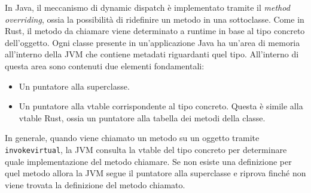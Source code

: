 In Java, il meccanismo di dynamic dispatch è implementato tramite il \textit{method overriding}, ossia la possibilità di ridefinire un metodo in una sottoclasse. Come in Rust, il metodo da chiamare viene determinato a runtime in base al tipo concreto dell'oggetto. Ogni classe presente in un'applicazione Java ha un'area di memoria all'interno della JVM che contiene metadati riguardanti quel tipo. All'interno di questa area sono contenuti due elementi fondamentali:
\begin{itemize}
    \item Un puntatore alla superclasse.
    \item Un puntatore alla vtable corrispondente al tipo concreto. Questa è simile alla vtable Rust, ossia un puntatore alla tabella dei metodi della classe.
\end{itemize}
In generale, quando viene chiamato un metodo su un oggetto tramite \texttt{invokevirtual}, la JVM consulta la vtable del tipo concreto per determinare quale implementazione del metodo chiamare. Se non esiste una definizione per quel metodo allora la JVM segue il puntatore alla superclasse e riprova finché non viene trovata la definizione del metodo chiamato. 

